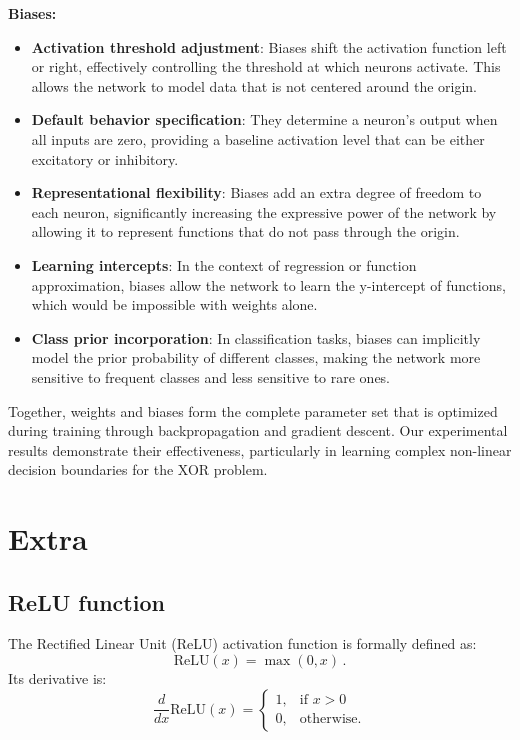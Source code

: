 \documentclass[twocolumn]{extarticle}
\begin{document}
\textbf{Biases:}
\begin{itemize}
    \item \textbf{Activation threshold adjustment}: Biases shift the activation function left or right, effectively controlling the threshold at which neurons activate. This allows the network to model data that is not centered around the origin.
    \item \textbf{Default behavior specification}: They determine a neuron's output when all inputs are zero, providing a baseline activation level that can be either excitatory or inhibitory.
    \item \textbf{Representational flexibility}: Biases add an extra degree of freedom to each neuron, significantly increasing the expressive power of the network by allowing it to represent functions that do not pass through the origin.
    \item \textbf{Learning intercepts}: In the context of regression or function approximation, biases allow the network to learn the y-intercept of functions, which would be impossible with weights alone.
    \item \textbf{Class prior incorporation}: In classification tasks, biases can implicitly model the prior probability of different classes, making the network more sensitive to frequent classes and less sensitive to rare ones.
\end{itemize}

Together, weights and biases form the complete parameter set that is optimized during training through backpropagation and gradient descent. Our experimental results demonstrate their effectiveness, particularly in learning complex non-linear decision boundaries for the XOR problem.

\section{Extra} \label{sec:extra}

\subsection{ReLU function}
The Rectified Linear Unit (ReLU) activation function is formally defined as:
\begin{equation}
\text{ReLU}(x) = \max(0, x) \, .
\end{equation}
Its derivative is: 
\begin{equation}
\frac{d}{dx} \text{ReLU}(x) =
\begin{cases}
	1, & \text{if } x > 0 \\
	0, & \text{otherwise.}
\end{cases}
\end{equation}
\end{document}
